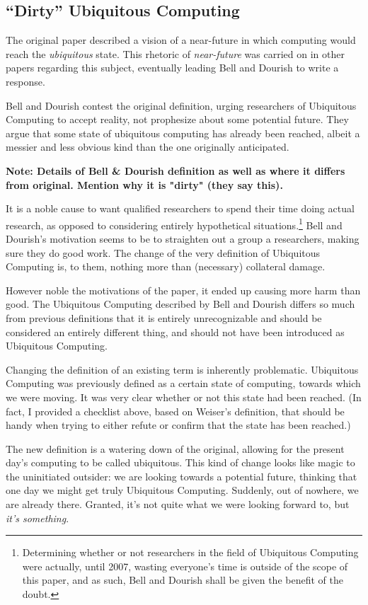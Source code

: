 \subsection*{``Dirty'' Ubiquitous Computing}

The original paper described a vision of a near-future in which computing would reach the \emph{ubiquitous} state.
This rhetoric of \emph{near-future} was carried on in other papers regarding this subject, eventually leading Bell
and Dourish to write a response.

Bell and Dourish contest the original definition, urging researchers of Ubiquitous Computing to accept reality, not
prophesize about some potential future. They argue that some state of ubiquitous computing has already been
reached, albeit a messier and less obvious kind than the one originally anticipated.

\textbf{Note: Details of Bell \& Dourish definition as well as where it differs from original. Mention why it is "dirty"
(they say this).\cite{bell07}}

It is a noble cause to want qualified researchers to spend their time doing actual research, as opposed to
considering entirely hypothetical situations.\footnote{Determining whether or not researchers in the field of
Ubiquitous Computing were actually, until 2007, wasting everyone's time is outside of the scope of this paper,
and as such, Bell and Dourish shall be given the benefit of the doubt.} Bell and Dourish's motivation seems to
be to straighten out a group a researchers, making sure they do good work. The change of the very definition of
Ubiquitous Computing is, to them, nothing more than (necessary) collateral damage.

However noble the motivations of the paper, it ended up causing more harm than good. The Ubiquitous Computing described
by Bell and Dourish differs so much from previous definitions that it is entirely unrecognizable and should be considered
an entirely different thing, and should not have been introduced as Ubiquitous Computing.

Changing the definition of an existing term is inherently problematic. Ubiquitous Computing was previously defined
as a certain state of computing, towards which we were moving. It was very clear whether or not this state had been
reached. (In fact, I provided a checklist above, based on Weiser's definition, that should be handy when trying to
either refute or confirm that the state has been reached.)

The new definition is a watering down of the original, allowing for the present day's computing to be called ubiquitous.
This kind of change looks like magic to the uninitiated outsider: we are looking towards a potential future,
thinking that one day we might get truly Ubiquitous Computing. Suddenly, out of nowhere, we are already there.
Granted, it's not quite what we were looking forward to, but \emph{it's something}.

